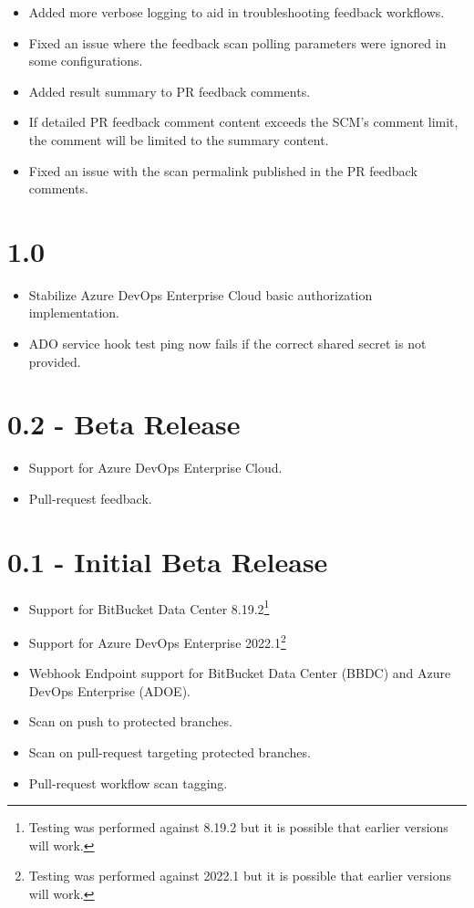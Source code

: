 \begin{itemize}
    \item Added more verbose logging to aid in troubleshooting feedback workflows.
    \item Fixed an issue where the feedback scan polling parameters were ignored in some configurations.
    \item Added result summary to PR feedback comments.
    \item If detailed PR feedback comment content exceeds the SCM's comment limit, the comment will be limited to the summary content.
    \item Fixed an issue with the scan permalink published in the PR feedback comments.
\end{itemize}


\section{1.0}

\begin{itemize}
    \item Stabilize Azure DevOps Enterprise Cloud basic authorization implementation.
    \item ADO service hook test ping now fails if the correct shared secret is not provided.
\end{itemize}


\section{0.2 - Beta Release}
   

\begin{itemize}
    \item Support for Azure DevOps Enterprise Cloud.
    \item Pull-request feedback.
\end{itemize}

\section{0.1 - Initial Beta Release}
   

\begin{itemize}
    \item Support for BitBucket Data Center 8.19.2\footnote{Testing was performed against 8.19.2 but it is possible that earlier versions will work.}
    \item Support for Azure DevOps Enterprise 2022.1\footnote{Testing was performed against 2022.1 but it is possible that earlier versions will work.}
    \item Webhook Endpoint support for BitBucket Data Center (BBDC) and Azure DevOps Enterprise (ADOE).
    \item Scan on push to protected branches.
    \item Scan on pull-request targeting protected branches.
    \item Pull-request workflow scan tagging.
\end{itemize}